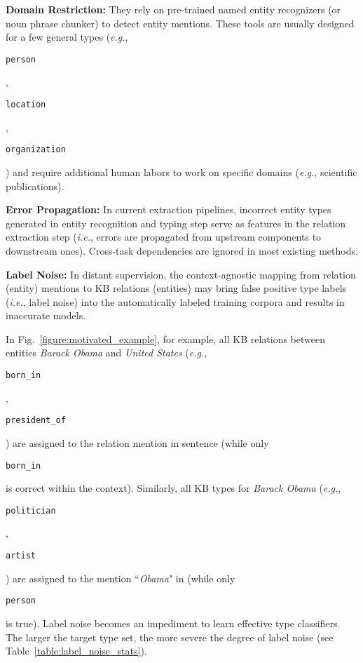 \documentclass[letterpaper]{sig-alternate-2013}
\def\ie{{\sl i.e.}}
\def\eg{{\sl e.g.}}
\begin{document}
\noindent \textbf{\small Domain Restriction:}
They rely on pre-trained named entity recognizers (or noun phrase chunker) to detect entity mentions. These tools are usually designed for a few general types (\eg, \begin{small}\texttt{person}\end{small}, \begin{small}\texttt{location}\end{small}, \begin{small}\texttt{organization}\end{small}) and require additional human labors to work on specific domains (\eg, scientific publications).

\noindent \textbf{\small Error Propagation:}
In current extraction pipelines, incorrect entity types generated in entity recognition and typing step serve as features in the relation extraction step (\ie, errors are propagated from upstream components to downstream ones). Cross-task dependencies are ignored in most existing methods.

\noindent \textbf{\small Label Noise:}
In distant supervision, the context-agnostic mapping from relation (entity) mentions to 
KB relations (entities) may bring false positive type labels (\ie, label noise) into the automatically labeled training corpora and results in inaccurate models.

In Fig.~\ref{figure:motivated_example}, for example, all KB relations between entities \textit{Barack Obama} and \textit{United States}  (\eg, \begin{small}\texttt{born\_in}\end{small}, \begin{small}\texttt{president\_of}\end{small}) are assigned to the relation mention in sentence  (while only \begin{small}\texttt{born\_in}\end{small} is correct within the  context). Similarly, all KB types for \textit{Barack Obama} (\eg, \begin{small}\texttt{politician}\end{small}, \begin{small}\texttt{artist}\end{small}) are assigned to the mention ``\textit{Obama}" in  (while only \begin{small}\texttt{person}\end{small} is true). Label noise becomes an impediment to learn effective type classifiers. The larger the target type set, the more severe the degree of label noise (see Table~\ref{table:label_noise_stats}).
\end{document}

